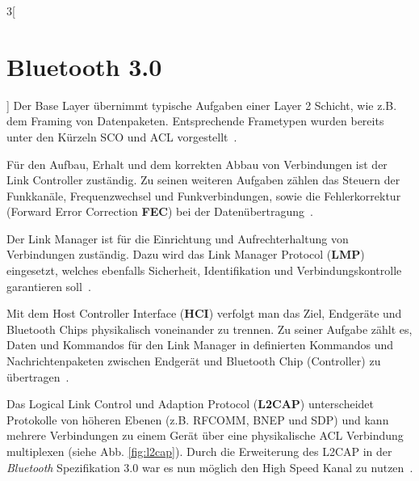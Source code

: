 \begin{multicols}{3}[\section{Bluetooth 3.0}]
\noindent
Der Base Layer übernimmt typische Aufgaben einer Layer 2 Schicht, wie z.B. dem Framing von Datenpaketen. Entsprechende Frametypen wurden bereits unter den Kürzeln SCO und ACL vorgestellt~\cite{bluetooth3.0.1}. 

Für den Aufbau, Erhalt und dem korrekten Abbau von Verbindungen ist der Link Controller \hspace{1px} zuständig. Zu \hspace{1px} seinen \hspace{1px} weiteren \hspace{1px} Aufgaben zählen das Steuern der Funkkanäle, Frequenzwechsel und Funkverbindungen, sowie die Fehlerkorrektur (Forward Error Correction \textbf{FEC}) bei der Datenübertragung~\cite{bluetooth3.0.3}.

Der Link Manager ist für die Einrichtung und Aufrechterhaltung von Verbindungen zuständig. Dazu wird das Link Manager Protocol (\textbf{LMP}) eingesetzt, welches ebenfalls Sicherheit, Identifikation und Verbindungskontrolle garantieren soll~\cite{bluetooth3.0.3}.

Mit dem Host Controller Interface (\textbf{HCI}) verfolgt man das Ziel, Endgeräte und Bluetooth Chips physikalisch voneinander zu trennen. Zu seiner Aufgabe zählt es, Daten und Kommandos für den Link Manager in definierten Kommandos und Nachrichtenpaketen zwischen Endgerät und Bluetooth Chip (Controller) zu übertragen~\cite{bluetooth3.0.1}.

Das Logical Link Control und Adaption Protocol (\textbf{L2CAP}) unterscheidet Protokolle von höheren Ebenen (z.B. RFCOMM, BNEP und SDP) und kann mehrere Verbindungen zu einem Gerät über eine physikalische ACL Verbindung multiplexen (siehe Abb. \ref{fig:l2cap}). Durch die Erweiterung des L2CAP in der \textit{Bluetooth} Spezifikation 3.0 war es nun möglich den High Speed Kanal zu nutzen~\cite{bluetooth3.0.1}.

\end{multicols}

